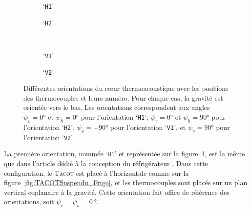 \begin{figure}[!ht]
    \centering
	\begin{subfigure}[c]{.47\textwidth}
		\centering
		
		\caption{`\texttt{H1}'}
		\label{fig:OrientationCore_H1}
	\end{subfigure}		%
	\begin{subfigure}[c]{.47\textwidth}
		\centering
		
		\caption{`\texttt{H2}'}
		\label{fig:OrientationCore_H2}
	\end{subfigure} \\ \vspace{1cm}
	\begin{subfigure}[c]{.47\textwidth}
		\centering
		
		\caption{`\texttt{V1}'}
		\label{fig:OrientationCore_V1}
	\end{subfigure} %
	\begin{subfigure}[c]{.47\textwidth}
		\centering
		
		\caption{`\texttt{V2}'}
		\label{fig:OrientationCore_V2}
	\end{subfigure}   
    \caption{Différentes orientations du c\oe{}ur thermoacoustique avec les positions des thermocouples et leurs numéro. Pour chaque cas, la gravité est orientée vers le bas. Les orientations correspondent aux angles  $\psi_v=\ang{0}$ et $\psi_h=\ang{0}$ pour l'orientation `\texttt{H1}',  $\psi_v=\ang{0}$ et $\psi_h=\ang{+90}$ pour l'orientation `\texttt{H2}',  $\psi_v=\ang{-90}$ pour l'orientation `\texttt{V1}', et  $\psi_v=\ang{+90}$ pour l'orientation `\texttt{V2}'.}%
    \label{fig:OrientationCore} %
\end{figure}

\medskip

La première orientation, nommée `\texttt{H1}' et représentée sur la figure~\ref{fig:OrientationCore_H1}, est la même que dans l'article dédié à la conception du réfrigérateur \cite{ramadan_design_2021}. Dans cette configuration, le \textsc{Tacot} est placé à l'horizontale comme sur la figure~\ref{fig:TACOTSuspendu_Frigo}, et les thermocouples sont placés sur un plan vertical coplanaire à la gravité. Cette orientation fait office de référence des orientations, soit $\psi_v=\psi_h=\qty{0}{\degree}$. \smallskip


